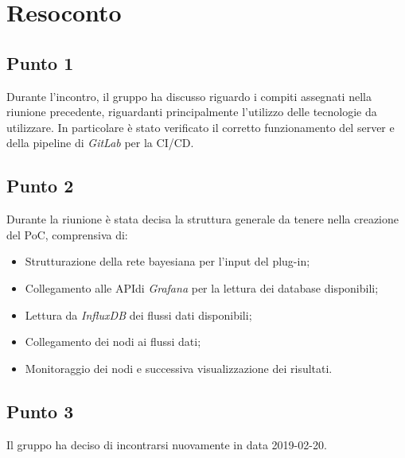 \section{Resoconto}

\subsection{Punto 1}
Durante l'incontro, il gruppo ha discusso riguardo i compiti assegnati nella riunione precedente, riguardanti principalmente l'utilizzo delle tecnologie da utilizzare. In particolare è stato verificato il corretto funzionamento del server e della pipeline di \textit{GitLab} per la CI/CD\glossario.

\subsection{Punto 2}

Durante la riunione è stata decisa la struttura generale da tenere nella creazione del PoC, comprensiva di:
\begin{itemize}
	\item Strutturazione della rete bayesiana per l'input del plug-in;
	\item Collegamento alle API\glossario di \textit{Grafana} per la lettura dei database disponibili;
	\item Lettura da \textit{InfluxDB} dei flussi dati disponibili; 
	\item Collegamento dei nodi ai flussi dati;
	\item Monitoraggio dei nodi e successiva visualizzazione dei risultati.
\end{itemize}

\subsection{Punto 3}
Il gruppo ha deciso di incontrarsi nuovamente in data 2019-02-20.